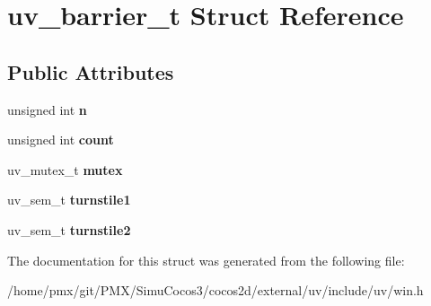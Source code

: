 \hypertarget{structuv__barrier__t}{}\section{uv\+\_\+barrier\+\_\+t Struct Reference}
\label{structuv__barrier__t}
\subsection*{Public Attributes}
\begin{DoxyCompactItemize}
\item 
\mbox{\label{structuv__barrier__t_a0b13a756edede21b0b182515a7c934ac}} 
unsigned int {\bfseries n}
\item 
\mbox{\label{structuv__barrier__t_ada3bb7359d5475cfc84889e1939388ad}} 
unsigned int {\bfseries count}
\item 
\mbox{\label{structuv__barrier__t_a29781de9ae88eae8bdaaec80ff6348b7}} 
uv\+\_\+mutex\+\_\+t {\bfseries mutex}
\item 
\mbox{\label{structuv__barrier__t_ae67078835ece66859e11a7cbe0563d19}} 
uv\+\_\+sem\+\_\+t {\bfseries turnstile1}
\item 
\mbox{\label{structuv__barrier__t_aaed8f8299f9b22d522d86b48fd19f407}} 
uv\+\_\+sem\+\_\+t {\bfseries turnstile2}
\end{DoxyCompactItemize}


The documentation for this struct was generated from the following file\+:\begin{DoxyCompactItemize}
\item 
/home/pmx/git/\+P\+M\+X/\+Simu\+Cocos3/cocos2d/external/uv/include/uv/win.\+h\end{DoxyCompactItemize}
